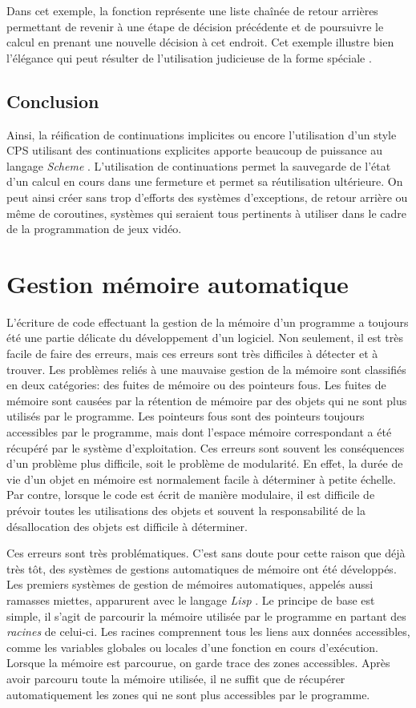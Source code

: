 \documentclass[12pt,twoside,letterpaper,francais]{book}
\newcommand{\lisp}{{\textit{Lisp }}}
\newcommand{\Schemelang}{{\textit{Scheme }}}
\newcommand{\scheme}[1]{\selectlanguage{english}{\tt #1}\selectlanguage{french}}
\begin{document}
Dans cet exemple, la fonction \scheme{fail} représente une liste
chaînée de retour arrières permettant de revenir à une étape de
décision précédente et de poursuivre le calcul en prenant une nouvelle
décision à cet endroit. Cet exemple illustre bien l'élégance qui peut
résulter de l'utilisation judicieuse de la forme spéciale
\scheme{call/cc}.


\FloatBarrier
\subsection{Conclusion}
Ainsi, la réification de continuations implicites ou encore
l'utilisation d'un style CPS utilisant des continuations explicites
apporte beaucoup de puissance au langage \Schemelang. L'utilisation de
continuations permet la sauvegarde de l'état d'un calcul en cours dans
une fermeture et permet sa réutilisation ultérieure. On peut ainsi
créer sans trop d'efforts des systèmes d'exceptions, de retour arrière
ou même de coroutines, systèmes qui seraient tous pertinents à
utiliser dans le cadre de la programmation de jeux vidéo.




\FloatBarrier
\section{Gestion mémoire automatique}
L'écriture de code effectuant la gestion de la mémoire d'un programme
a toujours été une partie délicate du développement d'un logiciel. Non
seulement, il est très facile de faire des erreurs, mais ces erreurs
sont très difficiles à détecter et à trouver. Les problèmes reliés à
une mauvaise gestion de la mémoire sont classifiés en deux catégories:
des fuites de mémoire ou des pointeurs fous. Les fuites de mémoire
sont causées par la rétention de mémoire par des objets qui ne sont
plus utilisés par le programme. Les pointeurs fous sont des pointeurs
toujours accessibles par le programme, mais dont l'espace mémoire
correspondant a été récupéré par le système d'exploitation. Ces
erreurs sont souvent les conséquences d'un problème plus difficile,
soit le problème de modularité. En effet, la durée de vie d'un objet
en mémoire est normalement facile à déterminer à petite échelle. Par
contre, lorsque le code est écrit de manière modulaire, il est
difficile de prévoir toutes les utilisations des objets et souvent la
responsabilité de la désallocation des objets est difficile à
déterminer.

Ces erreurs sont très problématiques. C'est sans doute pour cette
raison que déjà très tôt, des systèmes de gestions automatiques de
mémoire ont été développés. Les premiers systèmes de gestion de
mémoires automatiques, appelés aussi ramasses miettes, apparurent avec
le langage \lisp. Le principe de base est simple, il s'agit de
parcourir la mémoire utilisée par le programme en partant des
\emph{racines} de celui-ci. Les racines comprennent tous les liens aux
données accessibles, comme les variables globales ou locales d'une
fonction en cours d'exécution. Lorsque la mémoire est parcourue, on
garde trace des zones accessibles. Après avoir parcouru toute la
mémoire utilisée, il ne suffit que de récupérer automatiquement les
zones qui ne sont plus accessibles par le programme.
\end{document}
